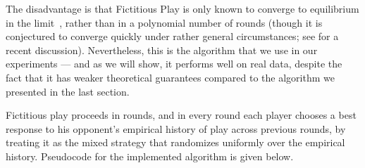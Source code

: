 The disadvantage is that Fictitious Play is only known to converge to
equilibrium in the limit~\cite{R51}, rather than in a polynomial number of rounds (though it is
conjectured to converge quickly under rather general circumstances; see \cite{DP14} for a recent discussion).
Nevertheless, this is the algorithm that we use in our
experiments --- and as we will show, it performs well on real data,
despite the fact that it has weaker theoretical guarantees compared to the algorithm we presented in the last section.

Fictitious play proceeds in rounds, and in every round each
player chooses a best response to his opponent's empirical history of play across previous rounds, by treating it as the mixed strategy that randomizes uniformly over the empirical history.
Pseudocode for the implemented algorithm is given below.

